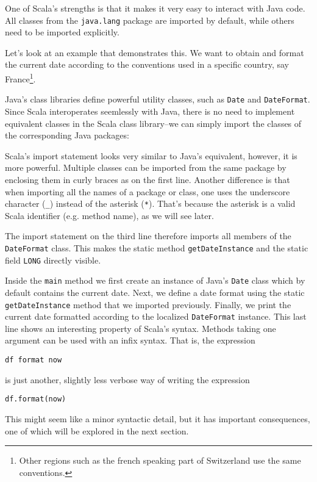 \documentclass[a4paper,11pt,twoside,titlepage]{article}
\begin{document}
One of Scala's strengths is that it makes it very easy to interact
with Java code. All classes from the \lstinline?java.lang? package are
imported by default, while others need to be imported explicitly.

Let's look at an example that demonstrates this.  We want to obtain
and format the current date according to the conventions used in a
specific country, say France\footnote{Other regions such as the french
  speaking part of Switzerland use the same conventions.}.

Java's class libraries define powerful utility classes, such as
\lstinline?Date? and \lstinline?DateFormat?. Since Scala interoperates
seemlessly with Java, there is no need to implement equivalent
classes in the Scala class library--we can simply import the classes
of the corresponding Java packages:

Scala's import statement looks very similar to Java's equivalent,
however, it is more powerful. Multiple classes can be imported from
the same package by enclosing them in curly braces as on the first
line. Another difference is that when importing all the names of a
package or class, one uses the underscore character (\lstinline?_?) instead
of the asterisk (\lstinline?*?). That's because the asterisk is a valid
Scala identifier (e.g. method name), as we will see later.

The import statement on the third line therefore imports all members
of the \lstinline?DateFormat? class. This makes the static method
\lstinline?getDateInstance? and the static field \lstinline?LONG? directly
visible.

Inside the \lstinline?main? method we first create an instance of Java's
\lstinline?Date? class which by default contains the current date. Next, we
define a date format using the static \lstinline?getDateInstance? method
that we imported previously. Finally, we print the current date
formatted according to the localized \lstinline?DateFormat? instance. This
last line shows an interesting property of Scala's syntax. Methods
taking one argument can be used with an infix syntax. That is, the
expression
\begin{lstlisting}
df format now
\end{lstlisting}
is just another, slightly less verbose way of writing the expression
\begin{lstlisting}
df.format(now)
\end{lstlisting}
This might seem like a minor syntactic detail, but it has important
consequences, one of which will be explored in the next section.
\end{document}
